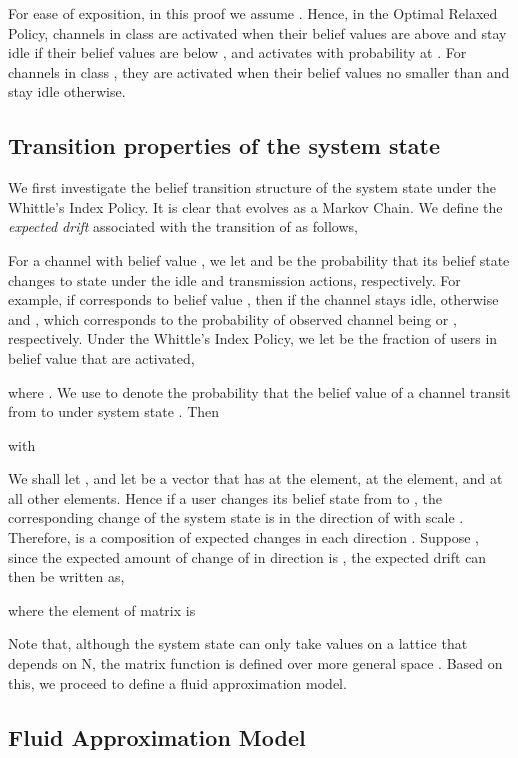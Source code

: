\documentclass[11pt,twocolumn]{IEEEtran}
\begin{document}
For ease of exposition, in this proof we assume . Hence, in the Optimal Relaxed Policy, channels in class  are activated when their belief values are above  and stay idle if their belief values are below , and activates with probability  at .  For channels in class , they are activated when their belief values no smaller than  and stay idle otherwise.

\subsection{Transition properties of the system state}


We first investigate the belief transition structure of the system state  under the Whittle's Index Policy. It is clear that  evolves as a Markov Chain. We define the \emph{expected drift}  associated with the transition of  as follows,



For a channel with belief value , we let  and  be the probability that its belief state changes to state  under the idle and transmission actions, respectively. For example, if  corresponds to belief value , then  if the channel stays idle, otherwise  and , which corresponds to the probability of observed channel being  or , respectively. Under the Whittle's Index Policy, we let  be the fraction of users in belief value  that are activated,

where .  We use  to denote the probability that the belief value of a channel transit from  to  under system state . Then

with



We shall let , and let  be a vector that has  at the  element,  at the  element, and  at all other elements. Hence if a user changes its belief state from  to , the corresponding change of the system state  is in the direction of  with scale . Therefore,  is a composition of expected changes in each direction . Suppose , since the expected amount of change of  in direction  is , the expected drift  can then be written as,

where the  element of matrix  is


Note that, although the system state  can only take values on a lattice that depends on N, the matrix function  is defined over more general space . Based on this, we proceed to define a fluid approximation model.

\subsection{Fluid Approximation Model}
\end{document}
